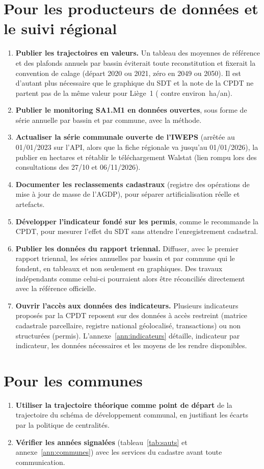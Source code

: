 \documentclass[11pt,a4paper]{report}
\newcommand{\haan}{\,ha/an}
\begin{document}
\section{Pour les producteurs de données et le suivi régional}
\begin{enumerate}[label=\textbf{R\arabic*}]
\item \textbf{Publier les trajectoires en valeurs.} Un tableau des moyennes de référence et des plafonds annuels par bassin éviterait toute reconstitution et fixerait la convention de calage (départ 2020 ou 2021, zéro en 2049 ou 2050). Il est d'autant plus nécessaire que le graphique du SDT et la note de la CPDT ne partent pas de la même valeur pour Liège~1 (\LUnRef{} contre environ \LUnRefCpdt\haan).
\item \textbf{Publier le monitoring SA1.M1 en données ouvertes}, sous forme de série annuelle par bassin et par commune, avec la méthode.
\item \textbf{Actualiser la série communale ouverte de l'IWEPS} (arrêtée au 01/01/2023 sur l'API, alors que la fiche régionale va jusqu'au 01/01/2026), la publier en hectares et rétablir le téléchargement Walstat (lien rompu lors des consultations des 27/10 et 06/11/2026).
\item \textbf{Documenter les reclassements cadastraux} (registre des opérations de mise à jour de masse de l'AGDP), pour séparer artificialisation réelle et artefacts.
\item \textbf{Développer l'indicateur fondé sur les permis}, comme le recommande la CPDT, pour mesurer l'effet du SDT sans attendre l'enregistrement cadastral.
\item \textbf{Publier les données du rapport triennal.} Diffuser, avec le premier rapport triennal, les séries annuelles par bassin et par commune qui le fondent, en tableaux et non seulement en graphiques. Des travaux indépendants comme celui-ci pourraient alors être réconciliés directement avec la référence officielle.
\item \textbf{Ouvrir l'accès aux données des indicateurs.} Plusieurs indicateurs proposés par la CPDT reposent sur des données à accès restreint (matrice cadastrale parcellaire, registre national géolocalisé, transactions) ou non structurées (permis). L'annexe~\ref{ann:indicateurs} détaille, indicateur par indicateur, les données nécessaires et les moyens de les rendre disponibles.
\end{enumerate}

\section{Pour les communes}
\begin{enumerate}[label=\textbf{R\arabic*},resume]
\item \textbf{Utiliser la trajectoire théorique comme point de départ} de la trajectoire du schéma de développement communal, en justifiant les écarts par la politique de centralités.
\item \textbf{Vérifier les années signalées} (tableau~\ref{tab:sauts} et annexe~\ref{ann:communes}) avec les services du cadastre avant toute communication.
\end{enumerate}
\end{document}
